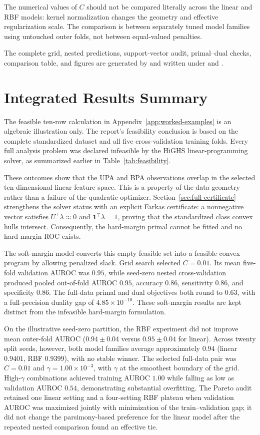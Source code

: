 \documentclass[11pt,a4paper]{article}
\numberwithin{equation}{section} %
\begin{document}
The numerical values of $C$ should not be compared literally across the
linear and RBF models: kernel normalization changes the geometry and effective
regularization scale. The comparison is between separately tuned model
families using untouched outer folds, not between equal-valued penalties.

The complete grid, nested predictions, support-vector audit, primal--dual
checks, comparison table, and figures are generated by
 and written under  and
.

\section{Integrated Results Summary}

The feasible ten-row calculation in Appendix~\ref{app:worked-examples} is an
algebraic illustration only. The report's feasibility conclusion is based on
the complete standardized dataset and all five cross-validation training
folds. Every full analysis problem was declared infeasible by the HiGHS
linear-programming solver, as summarized earlier in
Table~\ref{tab:feasibility}.

These outcomes show that the UPA and BPA observations overlap in the selected
ten-dimensional linear feature space. This is a property of the data geometry
rather than a failure of the quadratic optimizer.
Section~\ref{sec:full-certificate} strengthens the solver status with an
explicit Farkas certificate: a nonnegative vector satisfies
$U^\top\lambda\approx0$ and $\mathbf{1}^\top\lambda=1$, proving that the
standardized class convex hulls intersect. Consequently, the hard-margin
primal cannot be fitted and no hard-margin ROC exists.

The soft-margin model converts this empty feasible set into a feasible convex
program by allowing penalized slack. Grid search selected $C=0.01$. Its mean
five-fold validation AUROC was $0.95$, while seed-zero nested cross-validation produced
pooled out-of-fold AUROC $0.95$, accuracy $0.86$, sensitivity $0.86$, and specificity
$0.86$. The full-data primal and dual objectives both round to $0.63$, with a
full-precision duality gap of $4.85\times10^{-10}$. These soft-margin results
are kept distinct from the infeasible hard-margin formulation.

On the illustrative seed-zero partition, the RBF experiment did not improve
mean outer-fold AUROC ($0.94\pm0.04$ versus $0.95\pm0.04$ for linear). Across
twenty split seeds, however, both model families average approximately $0.94$
(linear $0.9401$, RBF $0.9399$), with no stable winner. The selected full-data pair was $C=0.01$ and
$\gamma=1.00\times10^{-3}$, with $\gamma$ at the smoothest boundary of the
grid. High-$\gamma$ combinations achieved training AUROC $1.00$ while falling
as low as validation AUROC $0.54$, demonstrating substantial overfitting. The
Pareto audit retained one linear setting and a four-setting RBF plateau when
validation AUROC was maximized jointly with minimization of the
train--validation gap; it did not change the parsimony-based preference for the
linear model after the repeated nested comparison found an effective tie.
\end{document}
